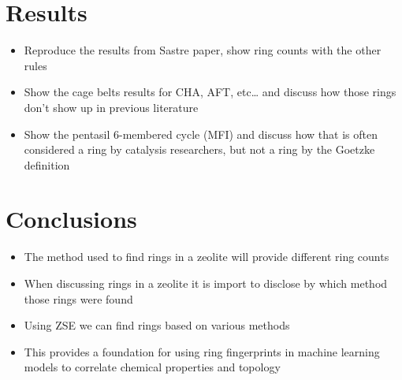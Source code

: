 \documentclass[11pt]{article}
\begin{document}
\section*{Results}
\label{sec:org51ff3f9}

\begin{itemize}
\item Reproduce the results from Sastre paper, show ring counts with the other rules
\item Show the cage belts results for CHA, AFT, etc\ldots{} and discuss how those rings don't show up in previous literature
\item Show the pentasil 6-membered cycle (MFI) and discuss how that is often considered a ring by catalysis researchers, but not a ring by the Goetzke definition
\end{itemize}


\section*{Conclusions}
\label{sec:orga1f2e62}

\begin{itemize}
\item The method used to find rings in a zeolite will provide different ring counts
\item When discussing rings in a zeolite it is import to disclose by which method those rings were found
\item Using ZSE we can find rings based on various methods
\item This provides a foundation for using ring fingerprints in machine learning models to correlate chemical properties and topology
\end{itemize}




\end{document}
